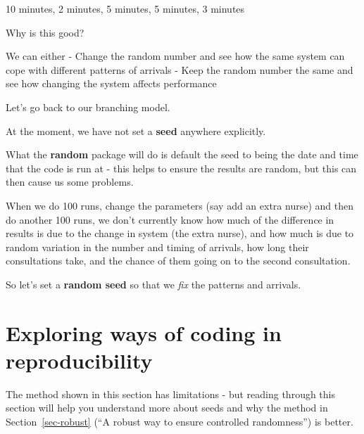 \documentclass[
  letterpaper,
  DIV=11,
  numbers=noendperiod]{scrreprt}
\begin{document}
10 minutes, 2 minutes, 5 minutes, 5 minutes, 3 minutes

Why is this good?

We can either - Change the random number and see how the same system can
cope with different patterns of arrivals - Keep the random number the
same and see how changing the system affects performance

Let's go back to our branching model.

At the moment, we have not set a \textbf{seed} anywhere explicitly.

What the \textbf{random} package will do is default the seed to being
the date and time that the code is run at - this helps to ensure the
results are random, but this can then cause us some problems.

When we do 100 runs, change the parameters (say add an extra nurse) and
then do another 100 runs, we don't currently know how much of the
difference in results is due to the change in system (the extra nurse),
and how much is due to random variation in the number and timing of
arrivals, how long their consultations take, and the chance of them
going on to the second consultation.

So let's set a \textbf{random seed} so that we \emph{fix} the patterns
and arrivals.

\section{Exploring ways of coding in
reproducibility}\label{exploring-ways-of-coding-in-reproducibility}

\begin{tcolorbox}[enhanced jigsaw, colframe=quarto-callout-warning-color-frame, bottomtitle=1mm, breakable, rightrule=.15mm, coltitle=black, colbacktitle=quarto-callout-warning-color!10!white, opacityback=0, leftrule=.75mm, arc=.35mm, toptitle=1mm, title=\textcolor{quarto-callout-warning-color}{\faExclamationTriangle}\hspace{0.5em}{Warning}, titlerule=0mm, colback=white, toprule=.15mm, bottomrule=.15mm, left=2mm, opacitybacktitle=0.6]

The method shown in this section has limitations - but reading through
this section will help you understand more about seeds and why the
method in Section~\ref{sec-robust} (``A robust way to ensure controlled
randomness'') is better.

\end{tcolorbox}
\end{document}
